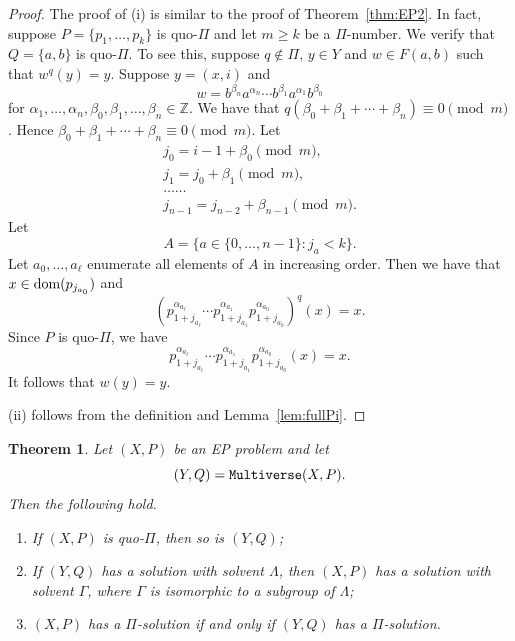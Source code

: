 \documentclass[10pt,a4paper]{amsart}
\newtheorem{theorem}{Theorem}[section]
\theoremstyle{definition}
\newcommand{\dom}{{\mbox{\rm dom}}}
\theoremstyle{definition}
\numberwithin{equation}{section}
\begin{document}
\begin{proof} The proof of (i) is similar to the proof of Theorem~\ref{thm:EP2}. In fact, suppose $P=\{p_1, \dots, p_k\}$ is quo-$\Pi$ and let $m\geq k$ be a $\Pi$-number. We verify that $Q=\{a, b\}$ is quo-$\Pi$. To see this, suppose $q\not\in \Pi$, $y\in Y$ and $w\in F(a,b)$ such that $w^q(y)=y$. Suppose $y=(x,i)$ and 
$$ w=b^{\beta_n}a^{\alpha_n}\cdots b^{\beta_1}a^{\alpha_1}b^{\beta_0} $$
for $\alpha_1,\dots, \alpha_n, \beta_0, \beta_1,\dots, \beta_n\in \mathbb{Z}$. We have that $q(\beta_0+\beta_1+\cdots+\beta_n)\equiv 0\pmod m$. Hence $\beta_0+\beta_1+\cdots+\beta_n\equiv 0\pmod{m}$.  Let 
$$\begin{array}{l} j_0=i-1+\beta_0\pmod{m},\\  j_1=j_0+\beta_1\pmod{m}, \\
\dots\dots\\  j_{n-1}=j_{n-2}+\beta_{n-1}\pmod{m}. 
\end{array}$$ 
Let 
$$ A=\big\{a\in\{0,\dots,n-1\}\colon j_a<k\big\}. $$
Let $a_0, \dots, a_{\ell}$ enumerate all elements of $A$ in increasing order. Then we have that $x\in \dom(p_{j_{a_0}})$ and
$$ (p_{1+j_{a_\ell}}^{\alpha_{a_\ell}}\cdots p_{1+j_{a_1}}^{\alpha_{a_1}}p_{1+j_{a_0}}^{\alpha_{a_0}})^q(x)=x. $$
Since $P$ is quo-$\Pi$, we have
$$ p_{1+j_{a_\ell}}^{\alpha_{a_\ell}}\cdots p_{1+j_{a_1}}^{\alpha_{a_1}}p_{1+j_{a_0}}^{\alpha_{a_0}}(x)=x. $$
It follows that $w(y)=y$.

(ii) follows from the definition and Lemma~\ref{lem:fullPi}. 
\end{proof}

\begin{theorem}\label{thm:multiverse} Let $(X, P)$ be an EP problem and let 
$$(Y, Q)={\tt Multiverse}(X, P).$$ Then the following hold.
\begin{enumerate}
\item[\rm (i)] If $(X, P)$ is quo-$\Pi$, then so is $(Y, Q)$;
\item[\rm (ii)] If $(Y, Q)$ has a solution with solvent $\Lambda$, then $(X, P)$ has a solution with solvent $\Gamma$, where $\Gamma$ is isomorphic to a subgroup of $\Lambda$;
\item[\rm (iii)] $(X, P)$ has a $\Pi$-solution if and only if $(Y, Q)$ has a $\Pi$-solution.
\end{enumerate}
\end{theorem}
\end{document}
